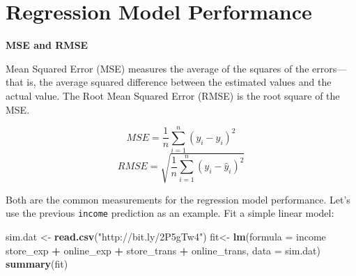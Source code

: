 \documentclass[12pt,]{krantz}
\makeatletter
\newenvironment{Shaded}{\begin{snugshade}}{\end{snugshade}}
\newcommand{\CommentTok}[1]{\textcolor[rgb]{0.37,0.37,0.37}{\textit{#1}}}
\newcommand{\ControlFlowTok}[1]{\textcolor[rgb]{0.27,0.27,0.27}{\textbf{#1}}}
\newcommand{\DataTypeTok}[1]{\textcolor[rgb]{0.27,0.27,0.27}{#1}}
\newcommand{\DecValTok}[1]{\textcolor[rgb]{0.06,0.06,0.06}{#1}}
\newcommand{\KeywordTok}[1]{\textcolor[rgb]{0.27,0.27,0.27}{\textbf{#1}}}
\newcommand{\NormalTok}[1]{#1}
\newcommand{\OperatorTok}[1]{\textcolor[rgb]{0.43,0.43,0.43}{\textbf{#1}}}
\newcommand{\OtherTok}[1]{\textcolor[rgb]{0.37,0.37,0.37}{#1}}
\newcommand{\StringTok}[1]{\textcolor[rgb]{0.5,0.5,0.5}{#1}}
\newenvironment{kframe}{%
\medskip{}
\setlength{\fboxsep}{.8em}
 \def\at@end@of@kframe{}%
 \ifinner\ifhmode%
  \def\at@end@of@kframe{\end{minipage}}%
  \begin{minipage}{\columnwidth}%
 \fi\fi%
 \def\FrameCommand##1{\hskip\@totalleftmargin \hskip-\fboxsep
 \colorbox{shadecolor}{##1}\hskip-\fboxsep
     \hskip-\linewidth \hskip-\@totalleftmargin \hskip\columnwidth}%
 \MakeFramed {\advance\hsize-\width
   \@totalleftmargin\z@ \linewidth\hsize
   \@setminipage}}%
 {\par\unskip\endMakeFramed%
 \at@end@of@kframe}
\renewenvironment{Shaded}{\begin{kframe}}{\end{kframe}}
\makeatother
\begin{document}
\begin{Shaded}
\end{Shaded}

\hypertarget{regression-model-performance}{%
\section{Regression Model Performance}\label{regression-model-performance}}

\textbf{MSE and RMSE}

Mean Squared Error (MSE) measures the average of the squares of the errors---that is, the average squared difference between the estimated values and the actual value. The Root Mean Squared Error (RMSE) is the root square of the MSE.

\[MSE=\frac{1}{n}\sum_{i=1}^{n}(y_{i}-\hat{y}_{i})^{2}\]
\[RMSE=\sqrt{\frac{1}{n}\sum_{i=1}^{n}(y_{i}-\hat{y}_{i})^{2}}\]

Both are the common measurements for the regression model performance. Let's use the previous \texttt{income} prediction as an example. Fit a simple linear model:

\begin{Shaded}
\begin{Highlighting}[]
\NormalTok{sim.dat <-}\StringTok{ }\KeywordTok{read.csv}\NormalTok{(}\StringTok{"http://bit.ly/2P5gTw4"}\NormalTok{)}
\NormalTok{fit<-}\StringTok{ }\KeywordTok{lm}\NormalTok{(}\DataTypeTok{formula =}\NormalTok{ income }\OperatorTok{~}\StringTok{ }\NormalTok{store_exp }\OperatorTok{+}\StringTok{ }\NormalTok{online_exp }\OperatorTok{+}\StringTok{ }\NormalTok{store_trans }\OperatorTok{+}\StringTok{ }
\StringTok{    }\NormalTok{online_trans, }\DataTypeTok{data =}\NormalTok{ sim.dat)}
\KeywordTok{summary}\NormalTok{(fit)}
\end{Highlighting}
\end{Shaded}
\end{document}
